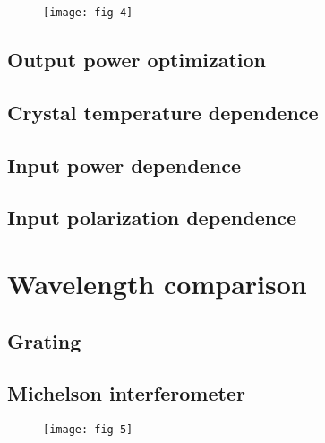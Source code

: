 \documentclass[11pt, english, fleqn, DIV=15, headinclude, BCOR=2cm]{scrreprt}
\begin{document}
\begin{figure}
    \centering
    \texttt{[image: fig-4]}
    \caption{%
    }
    \label{fig:fig-4}
\end{figure}

\subsection{Output power optimization}

\subsection{Crystal temperature dependence}

\subsection{Input power dependence}

\subsection{Input polarization dependence}

\section{Wavelength comparison}

\subsection{Grating}

\subsection{Michelson interferometer}

\begin{figure}
    \centering
    \texttt{[image: fig-5]}
    \caption{%
    }
    \label{fig:fig-5}
\end{figure}
\end{document}
